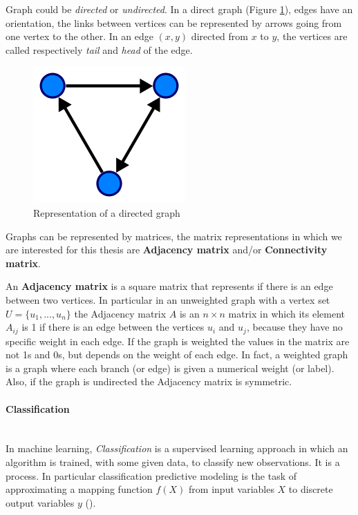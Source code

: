 Graph could be \textit{directed} or \textit{undirected}. In a direct graph (Figure  \ref{fig:diagram2}), edges have an orientation, the links between vertices can be represented by arrows going from one vertex to the other. In an edge $ (x,y) $ directed from $ x $ to $ y $, the vertices are called respectively \textit{tail} and \textit{head} of the edge.
\begin{figure}[htbp]
	\centering
	\includegraphics[scale=0.5]{Immagini/220px-Directed.svg.png}
	\caption{Representation of a directed graph}
	\label{fig:diagram2}
\end{figure}

Graphs can be represented by matrices, the matrix representations in which we are interested for this thesis are \textbf{Adjacency matrix} and/or \textbf{Connectivity matrix}. 

An \textbf{Adjacency matrix} is a square matrix that represents if there is an edge between two vertices. In particular in an unweighted graph with a vertex set $ U=\{u_{1}, ..., u_{n}\} $ the Adjacency matrix $ A $ is an $ n \times n $ matrix in which its element $ A_{ij} $ is 1 if there is an edge between the vertices $ u_{i} $ and $ u_{j} $, because they have no specific weight in each edge. If the graph is weighted the values in the matrix are not 1s and 0s, but depends on the weight of each edge. In fact, a weighted graph is a graph where each branch (or edge) is given a numerical weight (or label). Also, if the graph is undirected the Adjacency matrix is symmetric.


\paragraph{Classification}\
\\
In machine learning, \emph{Classification} is a supervised learning approach in which an algorithm is trained, with some given data, to classify new observations. It is a process. In particular classification predictive modeling is the task of approximating a mapping function $f(X)$ from input variables $X$ to discrete output variables $y$ (\cite{classification}).

